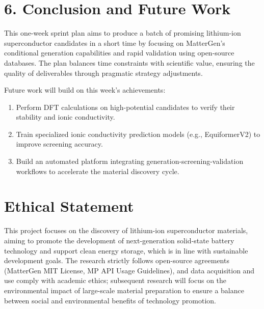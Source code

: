 \documentclass[letterpaper]{article} %
\begin{document}
\section{6. Conclusion and Future Work}

This one-week sprint plan aims to produce a batch of promising lithium-ion superconductor candidates in a short time by focusing on MatterGen's conditional generation capabilities and rapid validation using open-source databases. The plan balances time constraints with scientific value, ensuring the quality of deliverables through pragmatic strategy adjustments.

Future work will build on this week's achievements:
\begin{enumerate}
    \item Perform DFT calculations on high-potential candidates to verify their stability and ionic conductivity.
    \item Train specialized ionic conductivity prediction models (e.g., EquiformerV2) to improve screening accuracy.
    \item Build an automated platform integrating generation-screening-validation workflows to accelerate the material discovery cycle.
\end{enumerate}


\section*{Ethical Statement}
This project focuses on the discovery of lithium-ion superconductor materials, aiming to promote the development of next-generation solid-state battery technology and support clean energy storage, which is in line with sustainable development goals. The research strictly follows open-source agreements (MatterGen MIT License, MP API Usage Guidelines), and data acquisition and use comply with academic ethics; subsequent research will focus on the environmental impact of large-scale material preparation to ensure a balance between social and environmental benefits of technology promotion.
\end{document}
